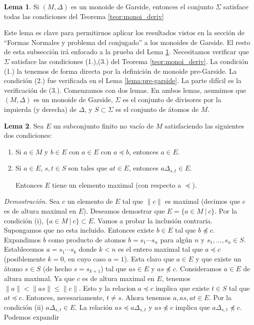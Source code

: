 \documentclass[12pt]{article}
\theoremstyle{definition}
\newtheorem{lema}{Lema}[section]
\providecommand{\norm}[1]{\lVert#1\rVert}
\begin{document}
\begin{lema}
Si $(M,\Delta)$ es un monoide de Garside, entonces el conjunto $\Sigma$ satisface todas las condiciones del Teorema \ref{teor:monoi_deriv}
\label{lema:garside}
\end{lema}

Este lema es clave para permitirnos aplicar los resultados vistos en la sección de ``Formas Normales y problema del conjugado'' a los monoides de Garside. El resto de esta subsección irá enfocado a la prueba del Lema \ref{lema:garside}. Necesitamos verificar que $\Sigma$ satisface las condiciones (1.),(3.) del Teorema \ref{teor:monoi_deriv}. La condición (1.) la tenemos de forma directa por la definición de monoide pre-Garside. La condición (2.) fue verificada en el Lema \ref{lema:pre-garside}. La parte difícil es la verificación de (3.). Comenzamos con dos lemas. En ambos lemas, asumimos que $(M,\Delta)$ es un monoide de Garside, $\Sigma$ es el conjunto de divisores por la izquierda (y derecha) de $\Delta$, y $S\subset \Sigma$ es el conjunto de átomos de $M$.

\begin{lema}
Sea $E$ un subconjunto finito no vacío de $M$ satisfaciendo las siguientes dos condiciones:
\begin{enumerate}[label=(\roman*).]
\item Si $a\in M$ y $b\in E$ con $a\in E$ con $a\preceq b$, entonces $a\in E$.
\item Si $a\in E$, $s,t\in S$ son tales que $at\in E$, entonces $a\Delta_{s,t}\in E$.

Entonces $E$ tiene un elemento maximal (con respecto a $\preceq$).
\end{enumerate}
\label{lema:garside1}
\end{lema}

\textit{Demostración.} Sea $c$ un elemento de $E$ tal que $\norm{c}$ es maximal (decimos que $c$ es de altura maximal en $E$). Deseamos demostrar que $E=\{a\in M\ |\ c\}$. Por la condición (i), $\{a\in M\ |\ c\}\subset E$. Vamos a probar la inclusión contraria. Supongamos que no esta incluido. Entonces existe $b\in E$ tal que $b\npreceq c$. Expandimos $b$ como producto de atomos $b=s_1\cdots s_n$ para algún $n$ y $s_1,\ldots,s_n\in S$. Establecemos $a=s_1\cdots s_k$ donde $k < n$ es el entero maximal tal que $a\preceq c$ (posiblemente $k=0$, en cuyo caso $a=1$). Esta claro que $a\in E$ y que existe un átomo $s\in S$ (de hecho $s=s_{k+1}$) tal que $as\in E$ y $as\npreceq c$. Consideramos $a\in E$ de altura maximal. Ya que $c$ es de altura maximal en $E$, tenemos $\norm{a}<\norm{as}\leq \norm{c}$. Esto y la relacion $a\preceq c$ implica que existe $t\in S$ tal que $at\preceq c$. Entonces, necesariamente, $t\neq s$. Ahora tenemos  $a,as, at\in E$. Por la condición (ii) $a\Delta_{s,t}\in E$. La relación $as\preceq a\Delta_{s,t}$ y $as\npreceq c$ implica que $a\Delta_{s,t}\npreceq c$. Podemos expandir
\end{document}
